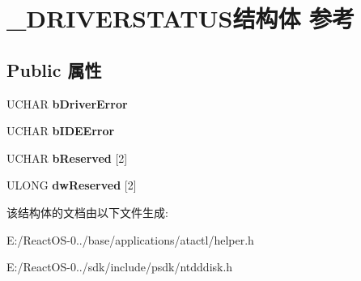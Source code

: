 \hypertarget{struct___d_r_i_v_e_r_s_t_a_t_u_s}{}\section{\+\_\+\+D\+R\+I\+V\+E\+R\+S\+T\+A\+T\+U\+S结构体 参考}
\label{struct___d_r_i_v_e_r_s_t_a_t_u_s}
\subsection*{Public 属性}
\begin{DoxyCompactItemize}
\item 
\mbox{\label{struct___d_r_i_v_e_r_s_t_a_t_u_s_ab1d9863fb217e6e38d73c03bf58efc78}} 
U\+C\+H\+AR {\bfseries b\+Driver\+Error}
\item 
\mbox{\label{struct___d_r_i_v_e_r_s_t_a_t_u_s_a89afb96920d387efebfc3223c569b785}} 
U\+C\+H\+AR {\bfseries b\+I\+D\+E\+Error}
\item 
\mbox{\label{struct___d_r_i_v_e_r_s_t_a_t_u_s_ac7efe348c48ea65341aafc22a6f522a9}} 
U\+C\+H\+AR {\bfseries b\+Reserved} \mbox{[}2\mbox{]}
\item 
\mbox{\label{struct___d_r_i_v_e_r_s_t_a_t_u_s_a8456b345c006778ef36aea6c2165d0f7}} 
U\+L\+O\+NG {\bfseries dw\+Reserved} \mbox{[}2\mbox{]}
\end{DoxyCompactItemize}


该结构体的文档由以下文件生成\+:\begin{DoxyCompactItemize}
\item 
E\+:/\+React\+O\+S-\/0../base/applications/atactl/helper.\+h\item 
E\+:/\+React\+O\+S-\/0../sdk/include/psdk/ntdddisk.\+h\end{DoxyCompactItemize}
